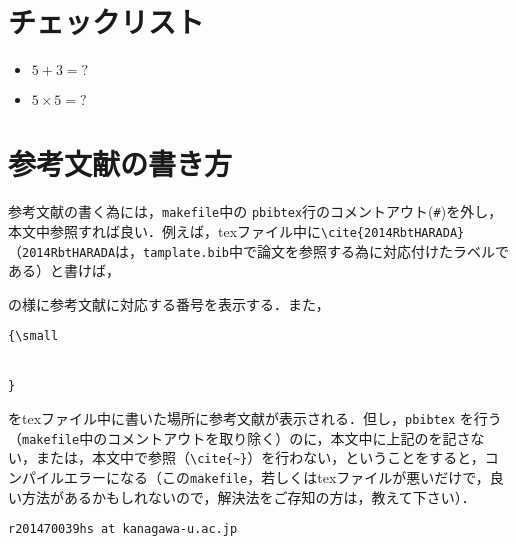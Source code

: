 \documentclass[10pt,twocolumn]{jarticle}
\begin{document}
\par

{\small
 
 
}

\section{チェックリスト}
\begin{itemize}
\item $5 + 3 = ?$
\item $5 \times 5 = ?$
\end{itemize}

\appendix
\section{参考文献の書き方}

参考文献の書く為には，\verb|makefile|中の \verb|pbibtex|行のコメントアウト(\verb|#|)を外し，本文中参照すれば良い．例えば，texファイル中に\verb|\cite{2014RbtHARADA}|（\verb|2014RbtHARADA|は，\verb|tamplate.bib|中で論文\cite{2014RbtHARADA}を参照する為に対応付けたラベルである）と書けば，\par
{\centering

\cite{2014RbtHARADA}

}
\noindent の様に参考文献に対応する番号を表示する．また，

\begin{verbatim}
{\small


}
\end{verbatim}
をtexファイル中に書いた場所に参考文献が表示される．但し，\verb|pbibtex| を行う（\verb|makefile|中のコメントアウトを取り除く）のに，本文中に上記の\verb||を記さない，または，本文中で参照（\verb|\cite{~}|）を行わない，ということをすると，コンパイルエラーになる（この\verb|makefile|，若しくはtexファイルが悪いだけで，良い方法があるかもしれないので，解決法をご存知の方は，教えて下さい）．\par
\noindent \verb|r201470039hs at kanagawa-u.ac.jp|
\end{document}
